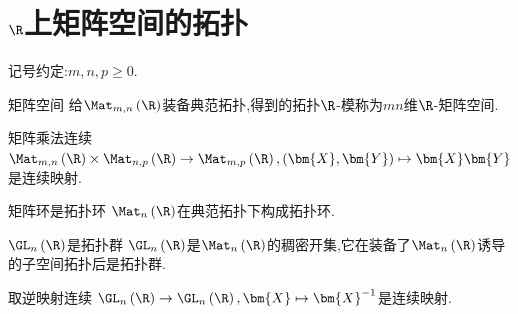 \section{\texorpdfstring{$\R$}{R}上矩阵空间的拓扑}

记号约定:$m,n,p\geq 0$.

\begin{definition}{矩阵空间}{}
	给$\Mat_{m,n}\left(\R\right)$装备典范拓扑,得到的拓扑$\R$-模称为$mn$维$\R$-矩阵空间.
\end{definition}

\begin{proposition}{矩阵乘法连续}{}
	$\Mat_{m,n}\left(\R\right)\times\Mat_{n,p}\left(\R\right)\to\Mat_{m,p}\left(\R\right),\left(\bm{X},\bm{Y}\right)\mapsto\bm{X}\bm{Y}$是连续映射.
\end{proposition}

\begin{corollary}{矩阵环是拓扑环}{}
	$\Mat_{n}\left(\R\right)$在典范拓扑下构成拓扑环.
\end{corollary}

\begin{proposition}{$\GL_{n}\left(\R\right)$是拓扑群}{}
	$\GL_{n}\left(\R\right)$是$\Mat_{n}\left(\R\right)$的稠密开集,它在装备了$\Mat_{n}\left(\R\right)$诱导的子空间拓扑后是拓扑群.
\end{proposition}

\begin{proposition}{取逆映射连续}{}
	$\GL_{n}\left(\R\right)\to\GL_{n}\left(\R\right),\bm{X}\mapsto\bm{X}^{-1}$是连续映射.
\end{proposition}